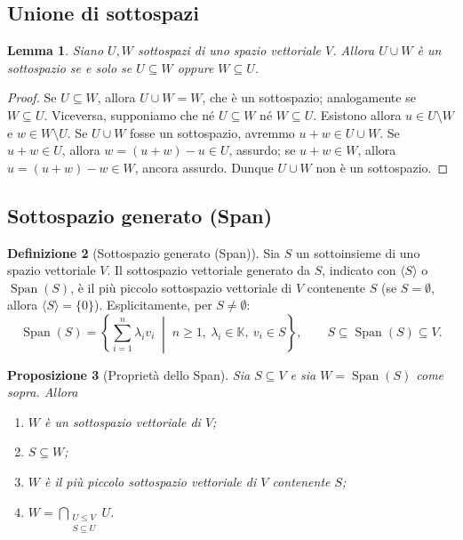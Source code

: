 \documentclass[11pt,a4paper]{article}
\theoremstyle{plain}
\newtheorem{prop}{Proposizione}[section]
\newtheorem{lemma}[prop]{Lemma}
\theoremstyle{definition}
\newtheorem{defn}[prop]{Definizione}
\theoremstyle{remark}
\begin{document}
\subsection{Unione di sottospazi}

\begin{lemma}\label{lemma:unione-sottospazi}
Siano $U,W$ sottospazi di uno spazio vettoriale $V$. Allora $U\cup W$ è un sottospazio se e solo se $U\subseteq W$ oppure $W\subseteq U$.
\end{lemma}
\begin{proof}
Se $U\subseteq W$, allora $U\cup W=W$, che è un sottospazio; analogamente se $W\subseteq U$.
Viceversa, supponiamo che né $U\subseteq W$ né $W\subseteq U$. Esistono allora $u\in U\setminus W$ e $w\in W\setminus U$. Se $U\cup W$ fosse un sottospazio, avremmo $u+w\in U\cup W$. Se $u+w\in U$, allora $w=(u+w)-u\in U$, assurdo; se $u+w\in W$, allora $u=(u+w)-w\in W$, ancora assurdo. Dunque $U\cup W$ non è un sottospazio.
\end{proof}

\subsection{Sottospazio generato (Span)}

\begin{defn}[Sottospazio generato (Span)]
    Sia $S$ un sottoinsieme di uno spazio vettoriale $V$. Il sottospazio vettoriale generato da $S$, indicato con $\langle S\rangle$ o $\operatorname{Span}(S)$, è il più piccolo sottospazio vettoriale di $V$ contenente $S$ (se $S = \emptyset$, allora $\langle S\rangle = \{0\}$). Esplicitamente, per $S\neq\emptyset$:
    \[
        \operatorname{Span}(S) =\left\{
        \sum_{i=1}^{n}\lambda_i v_i \;\middle|\; n\geq 1,\ \lambda_i\in\mathbb{K},\ v_i\in S
        \right\}, \qquad S\subseteq\operatorname{Span}(S)\subseteq V.
    \]
\end{defn}

\begin{prop}[Proprietà dello Span]
    Sia $S\subseteq V$ e sia $W=\operatorname{Span}(S)$ come sopra. Allora
    \begin{enumerate}[label=(\arabic*)]
        \item $W$ è un sottospazio vettoriale di $V$;
        \item $S\subseteq W$;
        \item $W$ è il più piccolo sottospazio vettoriale di $V$ contenente $S$;
        \item $W=\displaystyle\bigcap_{\substack{U\leq V\\S\subseteq U}}U$.
    \end{enumerate}
\end{prop}
\end{document}
